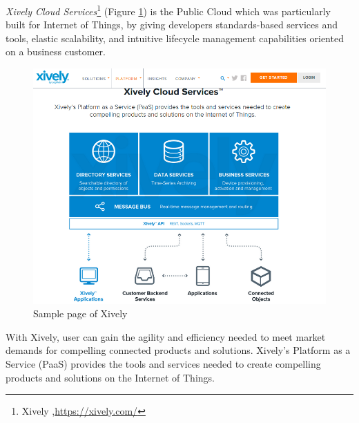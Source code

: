     \emph{Xively Cloud Services}\footnote{Xively ,\url{https://xively.com/}} (Figure \ref{img:xively}) is the Public Cloud which was particularly built for Internet of Things, by giving developers standards-based services and tools, elastic scalability, and intuitive lifecycle management capabilities oriented on a business customer. 
        \begin{figure}[!ht]
		\centering
		\includegraphics[scale=0.6]{Material/examples/Xively.png}   
		\caption[Sample page of Xively]{Sample page of Xively}    
		\label{img:xively}              
		\end{figure} 
	With Xively, user can gain the agility and efficiency needed to meet market demands for compelling connected products and solutions. Xively's Platform as a Service (PaaS) provides the tools and services needed to create compelling products and solutions on the Internet of Things.


